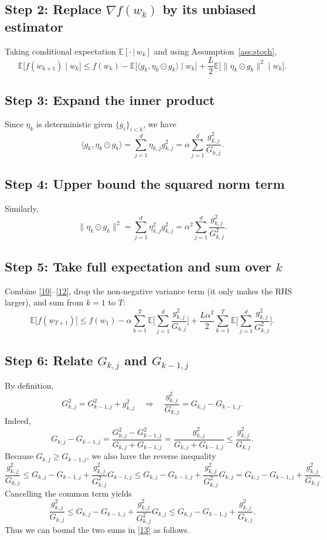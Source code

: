 \documentclass{article}
\newcommand{\E}{\mathbb{E}}
\begin{document}
\subsection*{Step 2: Replace $\nabla f(w_k)$ by its unbiased estimator}
Taking conditional expectation $\E[\cdot\,|\,w_k]$ and using Assumption~\ref{ass:stoch},
\[
\E\!\big[f(w_{k+1})\mid w_k\big]
\le f(w_k)-\E\!\big[\langle g_k,\eta_k\odot g_k\rangle\mid w_k\big]
+\frac{L}{2}\E\!\big[\|\eta_k\odot g_k\|^{2}\mid w_k\big]. \tag{10}
\]

\subsection*{Step 3: Expand the inner product}
Since $\eta_k$ is deterministic given $\{g_i\}_{i<k}$, we have
\[
\langle g_k,\eta_k\odot g_k\rangle = \sum_{j=1}^{d}\eta_{k,j} g_{k,j}^{2}
= \alpha\sum_{j=1}^{d}\frac{g_{k,j}^{2}}{G_{k,j}}. \tag{11}
\]

\subsection*{Step 4: Upper bound the squared norm term}
Similarly,
\[
\|\eta_k\odot g_k\|^{2}
= \sum_{j=1}^{d}\eta_{k,j}^{2} g_{k,j}^{2}
= \alpha^{2}\sum_{j=1}^{d}\frac{g_{k,j}^{2}}{G_{k,j}^{2}}. \tag{12}
\]

\subsection*{Step 5: Take full expectation and sum over $k$}
Combine \eqref{10}–\eqref{12}, drop the non‑negative variance term (it only makes the RHS larger), and sum from $k=1$ to $T$:
\[
\E\!\big[f(w_{T+1})\big] \le f(w_1)
- \alpha\sum_{k=1}^{T}\E\!\Big[\sum_{j=1}^{d}\frac{g_{k,j}^{2}}{G_{k,j}}\Big]
+\frac{L\alpha^{2}}{2}\sum_{k=1}^{T}\E\!\Big[\sum_{j=1}^{d}\frac{g_{k,j}^{2}}{G_{k,j}^{2}}\Big]. \tag{13}
\]

\subsection*{Step 6: Relate $G_{k,j}$ and $G_{k-1,j}$}
By definition,
\[
G_{k,j}^{2}=G_{k-1,j}^{2}+g_{k,j}^{2}\quad\Longrightarrow\quad
\frac{g_{k,j}^{2}}{G_{k,j}} = G_{k,j}-G_{k-1,j}. \tag{14}
\]
Indeed,
\[
G_{k,j}-G_{k-1,j}
= \frac{G_{k,j}^{2}-G_{k-1,j}^{2}}{G_{k,j}+G_{k-1,j}}
= \frac{g_{k,j}^{2}}{G_{k,j}+G_{k-1,j}}
\le \frac{g_{k,j}^{2}}{G_{k,j}}.
\tag{15}
\]
Because $G_{k,j}\ge G_{k-1,j}$, we also have the reverse inequality
\[
\frac{g_{k,j}^{2}}{G_{k,j}} \le G_{k,j}-G_{k-1,j} + \frac{g_{k,j}^{2}}{G_{k,j}^{2}}G_{k-1,j}
\le G_{k,j}-G_{k-1,j} + \frac{g_{k,j}^{2}}{G_{k,j}^{2}} G_{k,j}
= G_{k,j}-G_{k-1,j} + \frac{g_{k,j}^{2}}{G_{k,j}} .
\]
Cancelling the common term yields
\[
\frac{g_{k,j}^{2}}{G_{k,j}} \le G_{k,j}-G_{k-1,j} + \frac{g_{k,j}^{2}}{G_{k,j}^{2}} G_{k,j}
\le G_{k,j}-G_{k-1,j} + \frac{g_{k,j}^{2}}{G_{k,j}} .
\]
Thus we can bound the two sums in \eqref{13} as follows.
\end{document}
